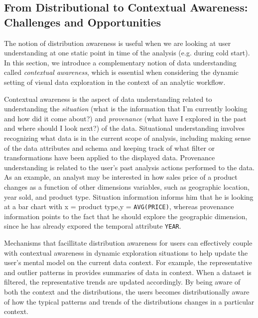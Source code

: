 \subsection{From Distributional to Contextual Awareness: Challenges and Opportunities}
\par The notion of distribution awareness is useful when we are looking at user understanding at one static point in time of the analysis (e.g. during cold start). In this section, we introduce a complementary notion of data understanding called \textit{contextual awareness}, which is essential when considering the dynamic setting of visual data exploration in the context of an analytic workflow.
\par Contextual awareness is the aspect of data understanding related to understanding the \textit{situation} (what is the information that I'm currently looking and how did it come about?) and \textit{provenance} (what have I explored in the past and where should I look next?) of the data. Situational understanding involves recognizing what data is in the current scope of analysis, including making sense of the data attributes and schema and keeping track of what filter or transformations have been applied to the displayed data. Provenance understanding is related to the user's past analysis actions performed to the data. As an example, an analyst may be interested in how sales price of a product changes as a function of other dimensions variables, such as geographic location, year sold, and product type. Situation information informs him that he is looking at a bar chart with x = product type,y = \texttt{AVG(PRICE)}, whereas provenance information points to the fact that he should explore the geographic dimension, since he has already expored the temporal attribute \texttt{YEAR}.
\par Mechanisms that facillitate distribution awareness for users can effectively couple with contextual awareness in dynamic exploration situations to help update the user's mental model on the current data context. For example, the representative and outlier patterns in \zv provides summaries of data in context. When a dataset is filtered, the representative trends are updated accordingly. By being aware of both the context and the distributions, the users becomes distributionally aware of how the typical patterns and trends of the distributions changes in a particular context. %
